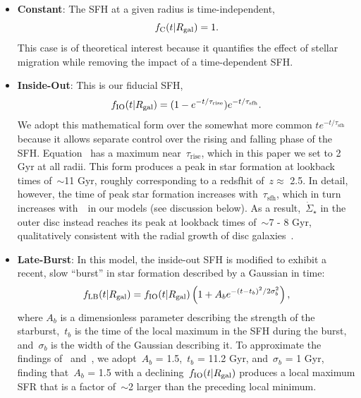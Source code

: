 \begin{itemize} 
	\item \textbf{Constant}: The SFH at a given radius is time-independent, 
	\begin{equation} 
	f_\text{C}(t|R_\text{gal}) = 1. 
	\label{migration:eq:constant_sfh} 
	\end{equation} 
	This case is of theoretical interest because it quantifies the effect of 
	stellar migration while removing the impact of a time-dependent SFH. 

	\item \textbf{Inside-Out}: This is our fiducial SFH, 
	\begin{equation} 
	f_\text{IO}(t|R_\text{gal}) = (1 - e^{-t / \tau_\text{rise}}) 
	e^{-t / \tau_\text{sfh}}. 
	\label{migration:eq:insideout_sfh} 
	\end{equation} 
	We adopt this mathematical form over the somewhat more common 
	$te^{-t/\tau_\text{sfh}}$ because it allows separate control over the 
	rising and falling phase of the SFH. 
	Equation~ has a maximum near~$\tau_\text{rise}$, 
	which in this paper we set to 2 Gyr at all radii. 
	This form produces a peak in star formation at lookback times of~$\sim$11 
	Gyr, roughly corresponding to a redsfhit of~$z \approx$ 2.5. 
	In detail, however, the time of peak star formation increases 
	with~$\tau_\text{sfh}$, which in turn increases with~\rgal~in our models 
	(see discussion below). 
	As a result,~$\dot{\Sigma}_\star$ in the outer disc instead reaches its 
	peak at lookback times of~$\sim$7 - 8 Gyr, qualitatively consistent with 
	the radial growth of disc galaxies~\citep{Bird2013, Bird2021, Frankel2019}. 

	\item \textbf{Late-Burst}: In this model, the inside-out SFH is modified to 
	exhibit a recent, slow ``burst'' in star formation described by a Gaussian 
	in time: 
	\begin{equation} 
	f_\text{LB}(t|R_\text{gal}) = f_\text{IO}(t|R_\text{gal}) 
	\left(1 + A_be^{-(t - t_b)^2/2\sigma_b^2}\right), 
	\label{migration:eq:lateburst_sfh} 
	\end{equation} 
	where $A_b$ is a dimensionless parameter describing the strength of the 
	starburst,~$t_b$ is the time of the local maximum in the SFH during the 
	burst, and~$\sigma_b$ is the width of the Gaussian describing it. 
	To approximate the findings of~\citet{Mor2019} and~\citet{Isern2019}, we 
	adopt~$A_b$ = 1.5,~$t_b$ = 11.2 Gyr, and~$\sigma_b$ = 1 Gyr, finding 
	that~$A_b$ = 1.5 with a declining~$f_\text{IO}(t|R_\text{gal})$ produces a local 
	maximum SFR that is a factor of~$\sim$2 larger than the preceding local 
	minimum. 


\end{itemize}
